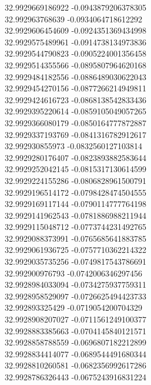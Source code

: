 {32.9929669186922	-0.0943879206378305\\
32.992963768639	-0.0934064718612292\\
32.9929606454609	-0.0924351369434998\\
32.9929575489961	-0.0914738134973836\\
32.9929544790823	-0.0905224001356458\\
32.9929514355566	-0.0895807964620168\\
32.9929484182556	-0.0886489030622043\\
32.9929454270156	-0.0877266214949811\\
32.9929424616723	-0.0868138542833436\\
32.9929395220614	-0.0859105049057265\\
32.9929366080179	-0.0850164777872887\\
32.9929337193769	-0.0841316782912617\\
32.992930855973	-0.0832560127103814\\
32.9929280176407	-0.0823893882583644\\
32.9929252042145	-0.0815317130614599\\
32.9929224155286	-0.0806828961500791\\
32.9929196514172	-0.0798428474504555\\
32.9929169117144	-0.0790114777764198\\
32.9929141962543	-0.0781886988211944\\
32.9929115048712	-0.0773744231492765\\
32.9929088373991	-0.0765685641883785\\
32.9929061936725	-0.0757710362214322\\
32.9929035735256	-0.0749817543786691\\
32.992900976793	-0.0742006346297456\\
32.9928984033094	-0.0734275937759311\\
32.9928958529097	-0.0726625494423733\\
32.992893325429	-0.0719054200704329\\
32.9928908207027	-0.0711561249100377\\
32.9928883385663	-0.0704145840121571\\
32.9928858788559	-0.0696807182212899\\
32.9928834414077	-0.0689544491680344\\
32.9928810260581	-0.0682356992617286\\
32.9928786326443	-0.0675243916831224\\
}
